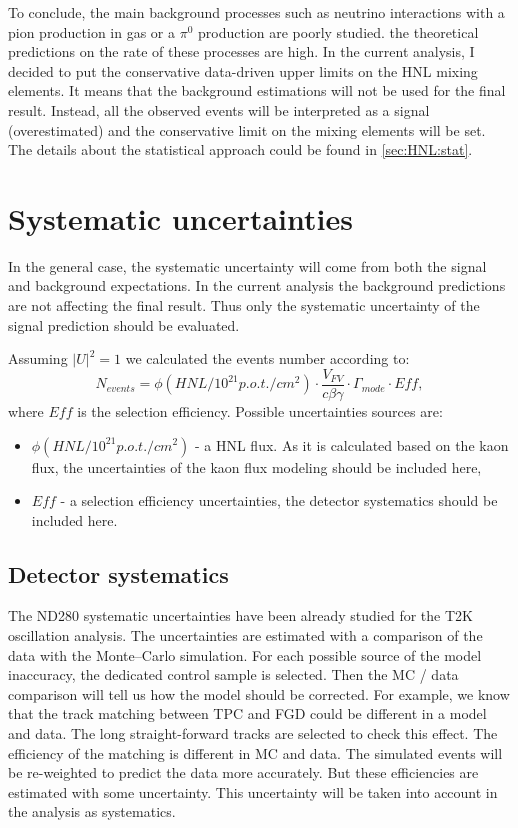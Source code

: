 \documentclass[../main.tex]{subfiles}
\begin{document}
To conclude, the main background processes such as neutrino interactions with a pion production in gas or a $\pi^0$ production are poorly studied. the theoretical predictions on the rate of these processes are high. In the current analysis, I decided to put the conservative data-driven upper limits on the HNL mixing elements. It means that the background estimations will not be used for the final result. Instead, all the observed events will be interpreted as a signal (overestimated) and the conservative limit on the mixing elements will be set. The details about the statistical approach could be found in \autoref{sec:HNL:stat}.

\section{Systematic uncertainties}
\label{sec:HNL:sys}
In the general case, the systematic uncertainty will come from both the signal and background expectations. In the current analysis the background predictions are not affecting the final result. Thus only the systematic uncertainty of the signal prediction should be evaluated.

Assuming $\left|U\right|^2=1$ we calculated the events number according to:
\begin{equation}
  N_{events}=\phi(HNL/10^{21}p.o.t./cm^2)\cdot\frac{V_{FV}}{c\beta\gamma}\cdot\Gamma_{mode}\cdot Eff,
\end{equation}
where $Eff$ is the selection efficiency. Possible uncertainties sources are:
\begin{itemize}
  \item $\phi(HNL/10^{21}p.o.t./cm^2)$ - a HNL flux. As it is calculated based on the kaon flux, the uncertainties of the kaon flux modeling should be included here,
  \item $Eff$ - a selection efficiency uncertainties, the detector systematics should be included here.
\end{itemize}

\subsection{Detector systematics}
The ND280 systematic uncertainties have been already studied for the T2K oscillation analysis. The uncertainties are estimated with a comparison of the data with the Monte--Carlo simulation. For each possible source of the model inaccuracy, the dedicated control sample is selected. Then the MC / data comparison will tell us how the model should be corrected. For example, we know that the track matching between TPC and FGD could be different in a model and data. The long straight-forward tracks are selected to check this effect. The efficiency of the matching is different in MC and data. The simulated events will be re-weighted to predict the data more accurately. But these efficiencies are estimated with some uncertainty. This uncertainty will be taken into account in the analysis as systematics.
\end{document}

